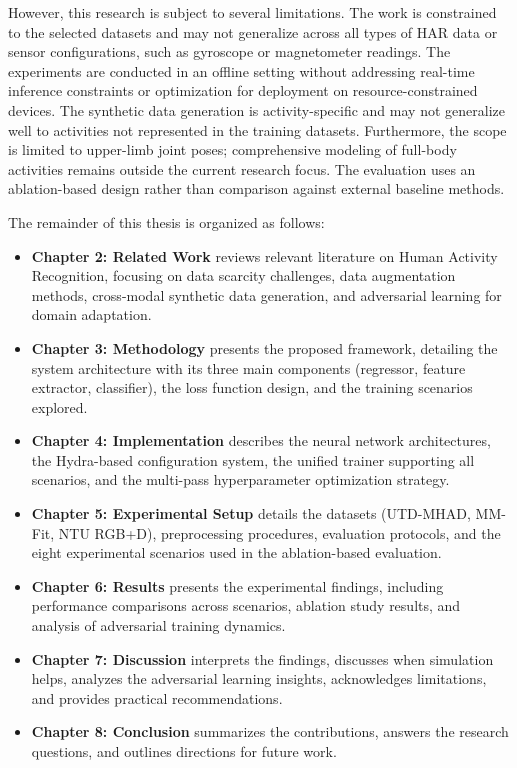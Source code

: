 However, this research is subject to several limitations. The work is constrained to the selected datasets and may not generalize across all types of HAR data or sensor configurations, such as gyroscope or magnetometer readings. The experiments are conducted in an offline setting without addressing real-time inference constraints or optimization for deployment on resource-constrained devices. The synthetic data generation is activity-specific and may not generalize well to activities not represented in the training datasets. Furthermore, the scope is limited to upper-limb joint poses; comprehensive modeling of full-body activities remains outside the current research focus. The evaluation uses an ablation-based design rather than comparison against external baseline methods.


The remainder of this thesis is organized as follows:

\begin{itemize}
    \item \textbf{Chapter 2: Related Work} reviews relevant literature on Human Activity Recognition, focusing on data scarcity challenges, data augmentation methods, cross-modal synthetic data generation, and adversarial learning for domain adaptation.

    \item \textbf{Chapter 3: Methodology} presents the proposed framework, detailing the system architecture with its three main components (regressor, feature extractor, classifier), the loss function design, and the training scenarios explored.

    \item \textbf{Chapter 4: Implementation} describes the neural network architectures, the Hydra-based configuration system, the unified trainer supporting all scenarios, and the multi-pass hyperparameter optimization strategy.

    \item \textbf{Chapter 5: Experimental Setup} details the datasets (UTD-MHAD, MM-Fit, NTU RGB+D), preprocessing procedures, evaluation protocols, and the eight experimental scenarios used in the ablation-based evaluation.

    \item \textbf{Chapter 6: Results} presents the experimental findings, including performance comparisons across scenarios, ablation study results, and analysis of adversarial training dynamics.

    \item \textbf{Chapter 7: Discussion} interprets the findings, discusses when simulation helps, analyzes the adversarial learning insights, acknowledges limitations, and provides practical recommendations.

    \item \textbf{Chapter 8: Conclusion} summarizes the contributions, answers the research questions, and outlines directions for future work.
\end{itemize}

